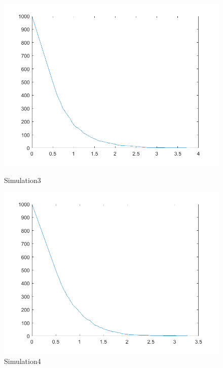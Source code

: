 \documentclass{article}
\begin{document}
\begin{figure}[htbp]
    \centering
    \begin{minipage}{0.45\linewidth}
        \centering
        \includegraphics[width=\linewidth]{graph/a3.png}
        \caption{Simulation3} 
        \label{a3}
    \end{minipage}
    \hfill
    \begin{minipage}{0.45\linewidth}
        \centering
        \includegraphics[width=\linewidth]{graph/a4.png}
        \caption{Simulation4}
        \label{a4}
    \end{minipage}
\end{figure}
\clearpage
\end{document}
